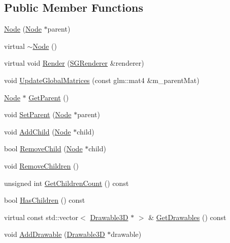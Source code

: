 \subsection*{Public Member Functions}
\begin{DoxyCompactItemize}
\item 
\mbox{\hyperlink{classngl_1_1_node_a6180056dc1d679998c296705a682d99d}{Node}} (\mbox{\hyperlink{classngl_1_1_node}{Node}} $\ast$parent)
\item 
virtual \mbox{\hyperlink{classngl_1_1_node_ab44ee89879e42f793401c3044caf2847}{$\sim$\+Node}} ()
\item 
virtual void \mbox{\hyperlink{classngl_1_1_node_a2186e08447bb62f8e68ffbab73c97776}{Render}} (\mbox{\hyperlink{classngl_1_1_s_g_renderer}{S\+G\+Renderer}} \&renderer)
\item 
void \mbox{\hyperlink{classngl_1_1_node_a30a0980f14e5fc7c940002a8104fe813}{Update\+Global\+Matrices}} (const glm\+::mat4 \&m\+\_\+parent\+Mat)
\item 
\mbox{\hyperlink{classngl_1_1_node}{Node}} $\ast$ \mbox{\hyperlink{classngl_1_1_node_a73a9225439f9d6ba3079e91badf00380}{Get\+Parent}} ()
\item 
void \mbox{\hyperlink{classngl_1_1_node_a1a839fa406684b66d73d5951fd19e62d}{Set\+Parent}} (\mbox{\hyperlink{classngl_1_1_node}{Node}} $\ast$parent)
\item 
void \mbox{\hyperlink{classngl_1_1_node_a70703f8c1af37972b898c1b0d84f91fb}{Add\+Child}} (\mbox{\hyperlink{classngl_1_1_node}{Node}} $\ast$child)
\item 
bool \mbox{\hyperlink{classngl_1_1_node_a22d2b48bef67028bdaf8aaaf1d9bf045}{Remove\+Child}} (\mbox{\hyperlink{classngl_1_1_node}{Node}} $\ast$child)
\item 
void \mbox{\hyperlink{classngl_1_1_node_aec85a101067b05f5c729cabbd02574cf}{Remove\+Children}} ()
\item 
unsigned int \mbox{\hyperlink{classngl_1_1_node_ad6eb66f2c3c583cb83b35724fa72fc1c}{Get\+Children\+Count}} () const
\item 
bool \mbox{\hyperlink{classngl_1_1_node_afdc404a6c7a7dd52ac16f05e19f8e7f1}{Has\+Children}} () const
\item 
virtual const std\+::vector$<$ \mbox{\hyperlink{classngl_1_1_drawable3_d}{Drawable3D}} $\ast$ $>$ \& \mbox{\hyperlink{classngl_1_1_node_a5a646908a0f05744d9d1377e0b3ccd24}{Get\+Drawables}} () const
\item 
void \mbox{\hyperlink{classngl_1_1_node_a92edb6c8179496fd3e3977fa2a3dd6a3}{Add\+Drawable}} (\mbox{\hyperlink{classngl_1_1_drawable3_d}{Drawable3D}} $\ast$drawable)

\end{DoxyCompactItemize}
